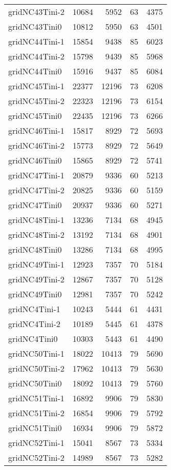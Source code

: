 \begin{longtable}{lrrrr}
gridNC43Tini-2 & 10684 & 5952 & 63 & 4375 \\
gridNC43Tini0 & 10812 & 5950 & 63 & 4501 \\
gridNC44Tini-1 & 15854 & 9438 & 85 & 6023 \\
gridNC44Tini-2 & 15798 & 9439 & 85 & 5968 \\
gridNC44Tini0 & 15916 & 9437 & 85 & 6084 \\
gridNC45Tini-1 & 22377 & 12196 & 73 & 6208 \\
gridNC45Tini-2 & 22323 & 12196 & 73 & 6154 \\
gridNC45Tini0 & 22435 & 12196 & 73 & 6266 \\
gridNC46Tini-1 & 15817 & 8929 & 72 & 5693 \\
gridNC46Tini-2 & 15773 & 8929 & 72 & 5649 \\
gridNC46Tini0 & 15865 & 8929 & 72 & 5741 \\
gridNC47Tini-1 & 20879 & 9336 & 60 & 5213 \\
gridNC47Tini-2 & 20825 & 9336 & 60 & 5159 \\
gridNC47Tini0 & 20937 & 9336 & 60 & 5271 \\
gridNC48Tini-1 & 13236 & 7134 & 68 & 4945 \\
gridNC48Tini-2 & 13192 & 7134 & 68 & 4901 \\
gridNC48Tini0 & 13286 & 7134 & 68 & 4995 \\
gridNC49Tini-1 & 12923 & 7357 & 70 & 5184 \\
gridNC49Tini-2 & 12867 & 7357 & 70 & 5128 \\
gridNC49Tini0 & 12981 & 7357 & 70 & 5242 \\
gridNC4Tini-1 & 10243 & 5444 & 61 & 4431 \\
gridNC4Tini-2 & 10189 & 5445 & 61 & 4378 \\
gridNC4Tini0 & 10303 & 5443 & 61 & 4490 \\
gridNC50Tini-1 & 18022 & 10413 & 79 & 5690 \\
gridNC50Tini-2 & 17962 & 10413 & 79 & 5630 \\
gridNC50Tini0 & 18092 & 10413 & 79 & 5760 \\
gridNC51Tini-1 & 16892 & 9906 & 79 & 5830 \\
gridNC51Tini-2 & 16854 & 9906 & 79 & 5792 \\
gridNC51Tini0 & 16934 & 9906 & 79 & 5872 \\
gridNC52Tini-1 & 15041 & 8567 & 73 & 5334 \\
gridNC52Tini-2 & 14989 & 8567 & 73 & 5282 \\

\end{longtable}
